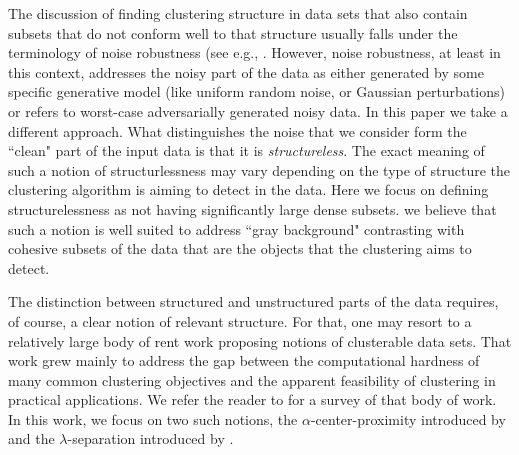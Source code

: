 \documentclass[anon,12pt]{colt2016} %
\begin{document}
The discussion of finding clustering structure in data sets that also contain subsets that do not conform well to that structure usually falls under the terminology of noise robustness (see e.g., \cite{balcan2012clustering, ackerman2009clusterability,
 cuesta1997trimmed, dave1993robust, garcia2008general}. However, noise robustness, at least in this context, addresses the noisy part of the data as either generated by some specific generative model (like uniform random noise, or Gaussian perturbations) or refers to worst-case adversarially generated noisy data. In this paper we take a different approach. What distinguishes the noise that we consider form the ``clean" part of the input data is that it is \emph{structureless}. The exact meaning of such a notion of structurlessness may vary depending on the type of structure the clustering algorithm is aiming to detect in the data. Here we focus on
defining structurelessness as  not having significantly large dense subsets. we believe that such a notion is well suited to address ``gray background" contrasting with cohesive subsets of the data that are the objects that the clustering aims to detect. 

The distinction between structured and unstructured parts of the data requires, of course, a clear notion of relevant structure. For that, one may resort to a relatively large body of rent work proposing notions of clusterable data sets. That work grew mainly to address the gap between the computational hardness of many common clustering 
objectives and the apparent feasibility of clustering in practical applications. We refer the reader to \cite{ben2015computational} for a survey of that body of work.
In this work, we focus on two such notions, the $\alpha$-center-proximity introduced by \cite{awasthi2012center} and the $\lambda$-separation introduced by \cite{ben2014clustering}.
\end{document}
